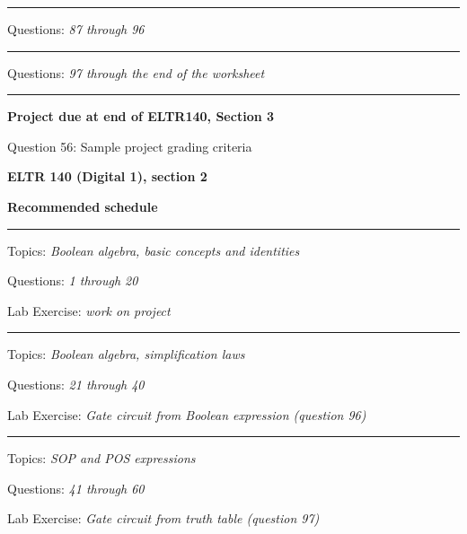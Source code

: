 \vskip 10pt
\hrule \vskip 5pt
\noindent
{}

\hskip 10pt Questions: {\it 87 through 96}
 
\vskip 10pt
\hrule \vskip 5pt
\noindent
{}

\hskip 10pt Questions: {\it 97 through the end of the worksheet}
 
\vskip 10pt
\hrule \vskip 5pt
\noindent
{}

\hskip 10pt {\bf Project due at end of ELTR140, Section 3}
 
\hskip 10pt Question 56: Sample project grading criteria
 
\vskip 10pt









\vfil \eject

\centerline{\bf ELTR 140 (Digital 1), section 2} \bigskip 
 
\vskip 10pt

\noindent
{\bf Recommended schedule}

\vskip 5pt

\hrule \vskip 5pt
\noindent
{}

\hskip 10pt Topics: {\it Boolean algebra, basic concepts and identities}
 
\hskip 10pt Questions: {\it 1 through 20}
 
\hskip 10pt Lab Exercise: {\it work on project}
 
\vskip 10pt
\hrule \vskip 5pt
\noindent
{}

\hskip 10pt Topics: {\it Boolean algebra, simplification laws}
 
\hskip 10pt Questions: {\it 21 through 40}
 
\hskip 10pt Lab Exercise: {\it Gate circuit from Boolean expression (question 96)}
 
\vskip 10pt
\hrule \vskip 5pt
\noindent
{}

\hskip 10pt Topics: {\it SOP and POS expressions}
 
\hskip 10pt Questions: {\it 41 through 60}
 
\hskip 10pt Lab Exercise: {\it Gate circuit from truth table (question 97)}
 

